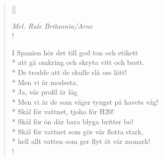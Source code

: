\settowidth{\versewidth}{I Spanien hör det till god ton och etikett}



\begin{verse}[\versewidth]

\flagverse{}
\emph{Mel. Rule Britannia/Arne}\\!


I Spanien hör det till god ton och etikett\\*
att gå omkring och skryta vitt och brett.\\*
De trodde att de skulle slå oss lätt!\\*
Men vi är modesta.\\*
Ja, vår profil är låg\\*
Men vi är de som väger tyngst på havets våg!\\*
Skål för vattnet, tjoho för H20!\\*
Skål för ön där bara blyga britter bo!\\*
Skål för vattnet som gör vår flotta stark,\\*
hell allt vatten som ger flyt åt vår monark!\\!




\end{verse}

